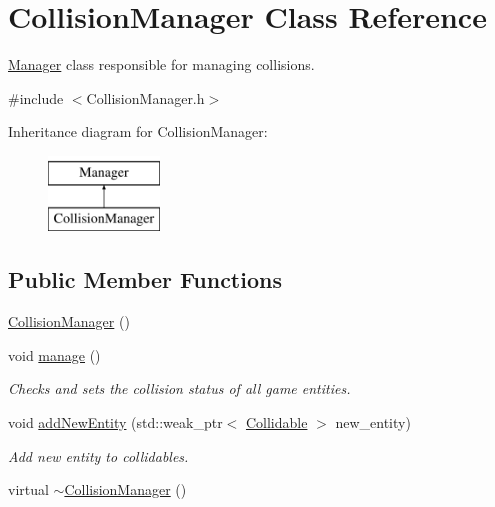 \hypertarget{classCollisionManager}{\section{Collision\-Manager Class Reference}
\label{classCollisionManager}
}


\hyperlink{classManager}{Manager} class responsible for managing collisions.  




{\ttfamily \#include $<$Collision\-Manager.\-h$>$}

Inheritance diagram for Collision\-Manager\-:\begin{figure}[H]
\begin{center}
\leavevmode
\includegraphics[height=2.000000cm]{classCollisionManager}
\end{center}
\end{figure}
\subsection*{Public Member Functions}
\begin{DoxyCompactItemize}
\item 
\hyperlink{classCollisionManager_a81f0b3f0cc0268c80f54714cd7ddb55f}{Collision\-Manager} ()
\item 
void \hyperlink{classCollisionManager_a43a05dc775565d23ecfaa1fb2638f6cf}{manage} ()
\begin{DoxyCompactList}\small\item\em Checks and sets the collision status of all game entities. \end{DoxyCompactList}\item 
void \hyperlink{classCollisionManager_a2ffe03a672702b8f33d8991b5d631e16}{add\-New\-Entity} (std\-::weak\-\_\-ptr$<$ \hyperlink{classCollidable}{Collidable} $>$ new\-\_\-entity)
\begin{DoxyCompactList}\small\item\em Add new entity to collidables. \end{DoxyCompactList}\item 
virtual \hyperlink{classCollisionManager_acdbb3c842f0ef1c7a028d3f080855766}{$\sim$\-Collision\-Manager} ()
\end{DoxyCompactItemize}
